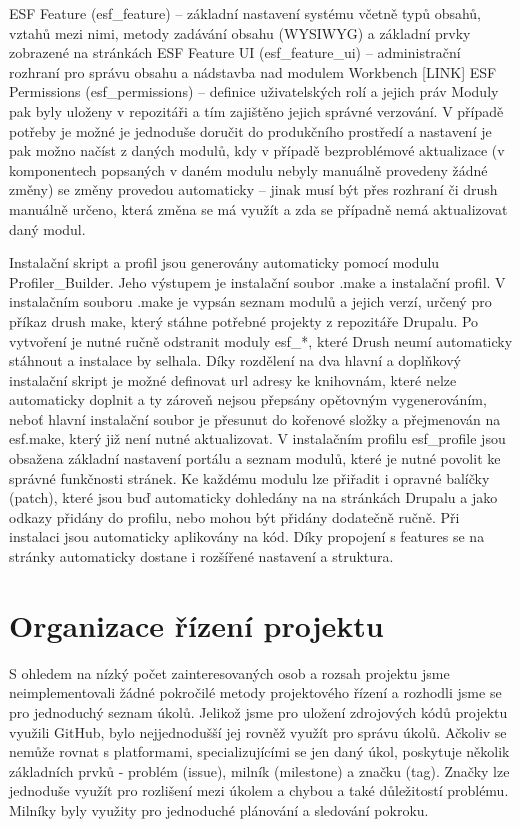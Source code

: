 ESF Feature (esf\_feature) – základní nastavení systému včetně typů obsahů, vztahů mezi nimi, metody zadávání obsahu (WYSIWYG) a základní prvky zobrazené na stránkách
ESF Feature UI (esf\_feature\_ui) – administrační rozhraní pro správu obsahu a nádstavba nad modulem Workbench [LINK]
ESF Permissions (esf\_permissions) – definice uživatelských rolí a jejich práv
Moduly pak byly uloženy v repozitáři a tím zajištěno jejich správné verzování. V případě potřeby je možné je jednoduše doručit do produkčního prostředí a nastavení je pak možno načíst z daných modulů, kdy v případě bezproblémové aktualizace (v komponentech popsaných v daném modulu nebyly manuálně provedeny žádné změny) se změny provedou automaticky – jinak musí být přes rozhraní či drush manuálně určeno, která změna se má využít a zda se případně nemá aktualizovat daný modul.

Instalační skript a profil jsou generovány automaticky pomocí modulu Profiler\_Builder. Jeho výstupem je instalační soubor .make a instalační profil. V instalačním souboru .make je vypsán seznam modulů a jejich verzí, určený pro příkaz drush make, který stáhne potřebné projekty z repozitáře Drupalu. Po vytvoření je nutné ručně odstranit moduly esf\_*, které Drush neumí automaticky stáhnout a instalace by selhala. Díky rozdělení na dva hlavní a doplňkový instalační skript je možné definovat url adresy ke knihovnám, které nelze automaticky doplnit a ty zároveň nejsou přepsány opětovným vygenerováním, neboť hlavní instalační soubor je přesunut do kořenové složky a přejmenován na esf.make, který již není nutné aktualizovat. V instalačním profilu esf\_profile jsou obsažena základní nastavení portálu a seznam modulů, které je nutné povolit ke správné funkčnosti stránek. Ke každému modulu lze přiřadit i opravné balíčky (patch), které jsou buď automaticky dohledány na na stránkách Drupalu a jako odkazy přidány do profilu, nebo mohou být přidány dodatečně ručně. Při instalaci jsou automaticky aplikovány na kód. Díky propojení s features se na stránky automaticky dostane i rozšířené nastavení a struktura.

\section{Organizace řízení projektu}
S ohledem na nízký počet zainteresovaných osob a rozsah projektu jsme neimplementovali žádné pokročilé metody projektového řízení a rozhodli jsme se pro jednoduchý seznam úkolů. Jelikož jsme pro uložení zdrojových kódů projektu využili GitHub, bylo nejjednodušší jej rovněž využít pro správu úkolů. Ačkoliv se nemůže rovnat s platformami, specializujícími se jen daný úkol, poskytuje několik základních prvků - problém (issue), milník (milestone) a značku (tag). Značky lze jednoduše využít pro rozlišení mezi úkolem a chybou a také důležitostí problému. Milníky byly využity pro jednoduché plánování a sledování pokroku.

